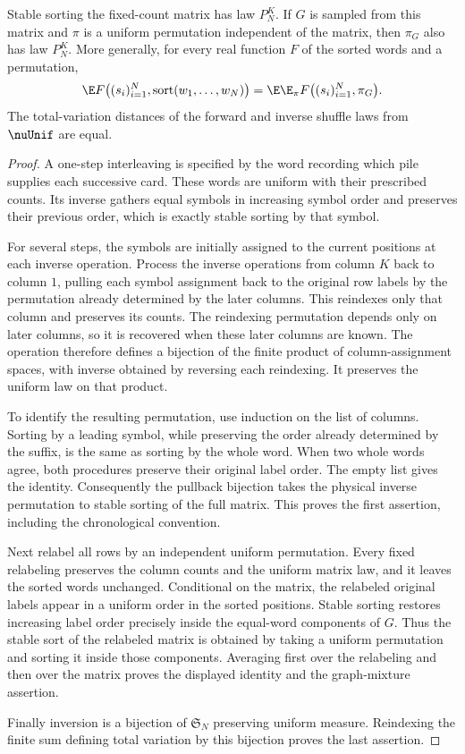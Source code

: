 \begin{lemma}\label{lem:matrix-graph}
Stable sorting the fixed-count matrix has law $P_N^K$. If $G$ is
sampled from this matrix and $\pi$ is a uniform permutation independent
of the matrix, then $\pi_G$ also has law $P_N^K$. More generally,
for every real function $F$ of the sorted words and a permutation,
\[
 \E F\bigl((s_i)_{i=1}^N,\operatorname{sort}(w_1,\ldots,w_N)\bigr)
 =\E\E_\pi F\bigl((s_i)_{i=1}^N,\pi_G\bigr).
\]
The total-variation distances of the forward and inverse shuffle
laws from $\nuUnif$ are equal.
\end{lemma}
\begin{proof}
A one-step interleaving is specified by the word recording which
pile supplies each successive card. These words are uniform with
their prescribed counts. Its inverse gathers equal symbols in
increasing symbol order and preserves their previous order, which
is exactly stable sorting by that symbol.

For several steps, the symbols are initially assigned to the current
positions at each inverse operation. Process the inverse operations
from column $K$ back to column $1$, pulling each symbol assignment
back to the original row labels by the permutation already determined
by the later columns. This reindexes only that column and preserves
its counts. The reindexing permutation depends only on later columns,
so it is recovered when these later columns are known. The operation
therefore defines a bijection of the finite product of column-assignment
spaces, with inverse obtained by reversing each reindexing. It
preserves the uniform law on that product.

To identify the resulting permutation, use induction on the list of
columns. Sorting by a leading symbol, while preserving the order
already determined by the suffix, is the same as sorting by the
whole word. When two whole words agree, both procedures preserve
their original label order. The empty list gives the identity.
Consequently the pullback bijection takes the physical inverse
permutation to stable sorting of the full matrix. This proves the
first assertion, including the chronological convention.

Next relabel all rows by an independent uniform permutation. Every
fixed relabeling preserves the column counts and the uniform matrix
law, and it leaves the sorted words unchanged. Conditional on the
matrix, the relabeled original labels appear in a uniform order in
the sorted positions. Stable sorting restores increasing label
order precisely inside the equal-word components of $G$. Thus the
stable sort of the relabeled matrix is obtained by taking a uniform
permutation and sorting it inside those components. Averaging first
over the relabeling and then over the matrix proves the displayed
identity and the graph-mixture assertion.

Finally inversion is a bijection of $\mathfrak S_N$ preserving
uniform measure. Reindexing the finite sum defining total variation
by this bijection proves the last assertion.
\end{proof}

